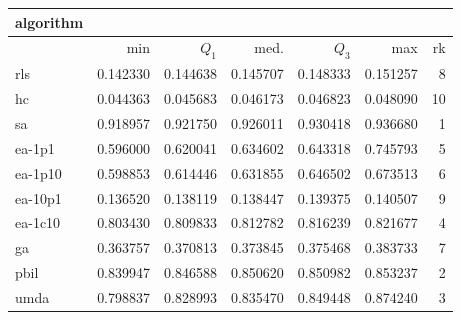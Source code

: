 \begin{tabular}{@{}l*{5}{>{{}}N{1}{3}}>{{}}N{2}{0}@{}}
\toprule
{algorithm} &  \\
\midrule
& {min} & {$Q_1$} & {med.} & {$Q_3$} & {max} & {rk}\\
\midrule
rls & 0.142330 & 0.144638 & 0.145707 & 0.148333 & 0.151257 & 8\\
hc & 0.044363 & 0.045683 & 0.046173 & 0.046823 & 0.048090 & 10\\
sa & {\color{blue}} 0.918957 & {\color{blue}} 0.921750 & {\color{blue}} 0.926011 & {\color{blue}} 0.930418 & {\color{blue}} 0.936680 & 1\\
ea-1p1 & 0.596000 & 0.620041 & 0.634602 & 0.643318 & 0.745793 & 5\\
ea-1p10 & 0.598853 & 0.614446 & 0.631855 & 0.646502 & 0.673513 & 6\\
ea-10p1 & 0.136520 & 0.138119 & 0.138447 & 0.139375 & 0.140507 & 9\\
ea-1c10 & 0.803430 & 0.809833 & 0.812782 & 0.816239 & 0.821677 & 4\\
ga & 0.363757 & 0.370813 & 0.373845 & 0.375468 & 0.383733 & 7\\
pbil & 0.839947 & 0.846588 & 0.850620 & 0.850982 & 0.853237 & 2\\
umda & 0.798837 & 0.828993 & 0.835470 & 0.849448 & 0.874240 & 3\\
\bottomrule
\end{tabular}
